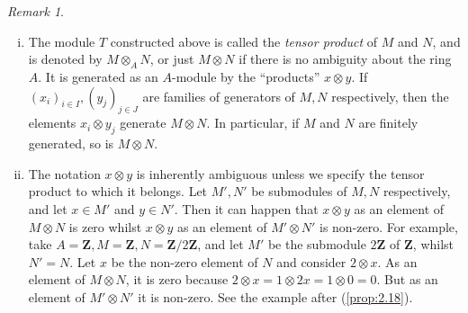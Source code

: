 \documentclass{standalone}
\theoremstyle{definition}
\theoremstyle{remark}
\newtheorem*{remark}{Remark}
\begin{document}
\begin{remark}
\begin{enumerate}[i)]
\item The module $T$ constructed above is called the {\itshape tensor product} of $M$
and $N$, and is denoted by $M \otimes_{A} N$, or just $M \otimes N$ if there is
no ambiguity about the ring $A$. It is generated as an $A$-module by the
``products'' $x \otimes y$. If
$(x_{i})_{i \in I},(y_{j})_{j \in J}$ are families of
generators of $M, N$ respectively, then the elements $x_{i} \otimes y_{j}$
generate $M \otimes N$. In particular, if $M$ and $N$ are finitely generated, so
is $M \otimes N$.
  \item The notation $x \otimes y$ is inherently ambiguous unless we specify the
tensor product to which it belongs. Let $M', N'$ be submodules of $M, N$
respectively, and let $x \in M'$ and $y \in N'$. Then it can happen that
$x \otimes y$ as an element of $M \otimes N$ is zero whilst $x \otimes y$ as an
element of $M' \otimes N'$ is non-zero. For example, take
$A=\mathbf{Z}, M=\mathbf{Z}, N=\mathbf{Z} / 2 \mathbf{Z}$, and let $M'$ be the submodule
$2 \mathbf{Z}$ of $\mathbf{Z}$, whilst $N'=N$. Let $x$ be the non-zero element of $N$ and
consider $2 \otimes x$. As an element of $M \otimes N$, it is zero because
$2 \otimes x=1 \otimes 2 x=1 \otimes 0=0$. But as an element of $M' \otimes N'$
it is non-zero. See the example after (\ref{prop:2.18}).


\end{enumerate}
\end{remark}
\end{document}
